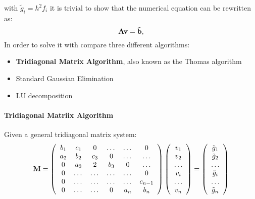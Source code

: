 \documentclass[10pt,a4paper,titlepage]{article}
\begin{document}
with $\tilde{g}_i=h^2 f_i$
it is trivial to show that the numerical equation can be rewritten as:
\[
   {\bf A}{\bf v} = \tilde{{\bf b}},
\]
In order to solve it with compare three different algorithms:
\begin{itemize}
\item {\bf Tridiagonal Matrix Algorithm}, also known as the Thomas algorithm
\item Standard Gaussian Elimination
\item LU decomposition
\end{itemize}
\paragraph{Tridiagonal Matriix Algorithm} Given a general tridiagonal matrix system:
\[
    {\bf M} = \left(\begin{array}{cccccc}
                           b_1& c_1& 0 &\dots   & \dots &0 \\
                           a_2 & b_2 & c_3 &0 &\dots &\dots \\
                           0&a_3 &2 & b_3 & 0 & \dots \\
                           0& \dots   & \dots &\dots   &\dots & 0 \\
                           0&\dots   &\dots  &\dots  &\dots& c_{n-1} \\
                           0&\dots &\dots  &0  &a_{n} & b_n \\
                      \end{array} \right)
                       \left(\begin{array}{c}
                           v_1\\
                           v_2\\
                           \dots\\
                           v_i\\
                           \dots\\
                           v_n\\
                      \end{array} \right)
	= \left(\begin{array}{c}
                           \tilde{g}_1\\
                           \tilde{g}_2\\
                           \dots\\
                           \tilde{g}_i\\
                           \dots\\
                           \tilde{g}_n\\
                      \end{array} \right)    
\]   
\end{document}
